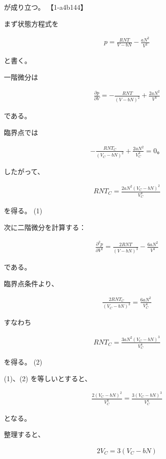\documentclass[platex,dvipdfmx,a4paper]{jsarticle}
\begin{document}
が成り立つ。 【1-a4b144】

まず状態方程式を

\begin{align*}
p
=
\frac{RNT}{V-bN}
-
\frac{aN^2}{V^2}
\end{align*}

と書く。

一階微分は

\begin{align*}
\frac{\partial p}{\partial V}
=
-\frac{RNT}{(V-bN)^2}
+
\frac{2aN^2}{V^3}
\end{align*}

である。

臨界点では

\begin{align*}
-\frac{RNT_C}{(V_C-bN)^2}
+
\frac{2aN^2}{V_C^3}
=
0。
\end{align*}

したがって、

\begin{align*}
RNT_C
=
\frac{2aN^2(V_C-bN)^2}{V_C^3}
\end{align*}

を得る。 \hfill (1)

次に二階微分を計算する：

\begin{align*}
\frac{\partial^2p}{\partial V^2}
=
\frac{2RNT}{(V-bN)^3}
-
\frac{6aN^2}{V^4}
\end{align*}

である。

臨界点条件より、

\begin{align*}
\frac{2RNT_C}{(V_C-bN)^3}
=
\frac{6aN^2}{V_C^4}
\end{align*}

すなわち

\begin{align*}
RNT_C
=
\frac{3aN^2(V_C-bN)^3}{V_C^4}
\end{align*}

を得る。 \hfill (2)

(1)、(2) を等しいとすると、

\begin{align*}
\frac{2(V_C-bN)^2}{V_C^3}
=
\frac{3(V_C-bN)^3}{V_C^4}
\end{align*}

となる。

整理すると、

\begin{align*}
2V_C
=
3(V_C-bN)
\end{align*}
\end{document}
